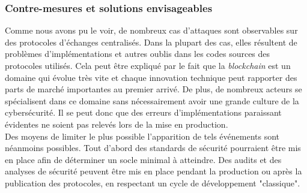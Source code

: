 \subsubsection{Contre-mesures et solutions envisageables}
Comme nous avons pu le voir, de nombreux cas d'attaques sont observables sur des protocoles d'échanges centralisés. 
Dans la plupart des cas, elles résultent de problèmes d'implémentations et autres oublis dans les codes sources des protocoles utilisés. 
Cela peut être expliqué par le fait que la \textit{blockchain} est un domaine qui évolue très vite et chaque innovation technique peut rapporter des parts de marché importantes au premier arrivé. 
De plus, de nombreux acteurs se spécialisent dans ce domaine sans nécessairement avoir une grande culture de la cybersécurité.
Il se peut donc que des erreurs d'implémentations paraissant évidentes ne soient pas relevés lors de la mise en production. \\ 
Des moyens de limiter le plus possible l'apparition de tels événements sont néanmoins possibles. 
Tout d'abord des standards de sécurité pourraient être mis en place afin de déterminer un socle minimal à atteindre. 
Des audits et des analyses de sécurité peuvent être mis en place pendant la production ou après la publication des protocoles, en respectant un cycle de développement "classique".
